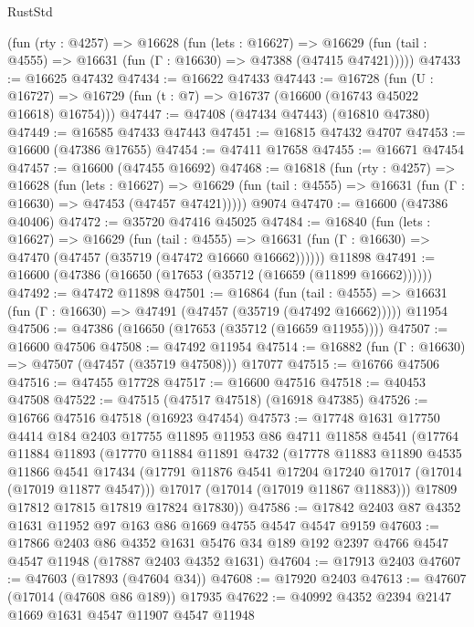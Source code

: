 \begin{lexlean}{RustStd}
\begin{coremodule}
{\begin{coremodule}
{{{{{{{{{{{{{{{{{{{{{{{{{{{{{{{{{{{{{{{{{{{{{{{{{{{{{{{    (fun (rty : @4257) =>
    @16628
      (fun (lets : @16627) =>
      @16629 (fun (tail : @4555) => @16631 (fun (Γ : @16630) => @47388 (@47415 @47421)))))
@47433 := @16625 @47432
@47434 := @16622 @47433
@47443 := @16728
    (fun (U : @16727) => @16729 (fun (t : @7) => @16737 (@16600 (@16743 @45022 @16618) @16754)))
@47447 := @47408 (@47434 @47443) (@16810 @47380)
@47449 := @16585 @47433 @47443
@47451 := @16815 @47432 @4707
@47453 := @16600 (@47386 @17655)
@47454 := @47411 @17658
@47455 := @16671 @47454
@47457 := @16600 (@47455 @16692)
@47468 := @16818
    (fun (rty : @4257) =>
    @16628
      (fun (lets : @16627) =>
      @16629 (fun (tail : @4555) => @16631 (fun (Γ : @16630) => @47453 (@47457 @47421)))))
    @9074
@47470 := @16600 (@47386 @40406)
@47472 := @35720 @47416 @45025
@47484 := @16840
    (fun (lets : @16627) =>
    @16629
      (fun (tail : @4555) =>
      @16631 (fun (Γ : @16630) => @47470 (@47457 (@35719 (@47472 @16660 @16662))))))
    @11898
@47491 := @16600 (@47386 (@16650 (@17653 (@35712 (@16659 (@11899 @16662))))))
@47492 := @47472 @11898
@47501 := @16864
    (fun (tail : @4555) => @16631 (fun (Γ : @16630) => @47491 (@47457 (@35719 (@47492 @16662)))))
    @11954
@47506 := @47386 (@16650 (@17653 (@35712 (@16659 @11955))))
@47507 := @16600 @47506
@47508 := @47492 @11954
@47514 := @16882 (fun (Γ : @16630) => @47507 (@47457 (@35719 @47508))) @17077
@47515 := @16766 @47506
@47516 := @47455 @17728
@47517 := @16600 @47516
@47518 := @40453 @47508
@47522 := @47515 (@47517 @47518) (@16918 @47385)
@47526 := @16766 @47516 @47518 (@16923 @47454)
@47573 := @17748
    @1631
    @17750
    @4414
    @184
    @2403
    @17755
    @11895
    @11953
    @86
    @4711
    @11858
    @4541
    (@17764
      @11884
      @11893
      (@17770
        @11884
        @11891
        @4732
        (@17778
          @11883
          @11890
          @4535
          @11866
          @4541
          @17434
          (@17791 @11876 @4541 @17204 @17240 @17017 (@17014 (@17019 @11877 @4547)))
          @17017
          (@17014 (@17019 @11867 @11883)))
        @17809
        @17812
        @17815
        @17819
        @17824
        @17830))
@47586 := @17842 @2403 @87 @4352 @1631 @11952 @97 @163 @86 @1669 @4755 @4547 @4547 @9159
@47603 := @17866
    @2403
    @86
    @4352
    @1631
    @5476
    @34
    @189
    @192
    @2397
    @4766
    @4547
    @4547
    @11948
    (@17887 @2403 @4352 @1631)
@47604 := @17913 @2403
@47607 := @47603 (@17893 (@47604 @34))
@47608 := @17920 @2403
@47613 := @47607 (@17014 (@47608 @86 @189)) @17935
@47622 := @40992 @4352 @2394 @2147 @1669 @1631 @4547 @11907 @4547 @11948
}}}}}}}}}}}}}}}}}}}}}}}}}}}}}}}}}}}}}}}}}}}}}}}}}}}}}}}
\end{coremodule}}
\end{coremodule}
\end{lexlean}
